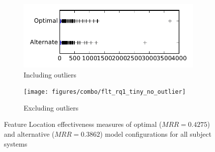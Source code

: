 
\begin{figure}
    \centering
    \begin{subfigure}{.4\textwidth}
        \centering
        \includegraphics[height=0.4\textheight]{figures/combo/flt_rq1_tiny}
        \caption{Including outliers}\label{fig:combo:flt:rq1:tiny_outlier}
    \end{subfigure}%
    \begin{subfigure}{.4\textwidth}
        \centering
        \texttt{[image: figures/combo/flt\_rq1\_tiny\_no\_outlier]}
        \caption{Excluding outliers}\label{fig:combo:flt:rq1:tiny_no_outlier}
    \end{subfigure}
\caption{Feature Location effectiveness measures of optimal ($MRR=0.4275$) and alternative ($MRR=0.3862$) model configurations for all subject systems}
\label{fig:combo:flt:rq1:tiny}
\end{figure}
